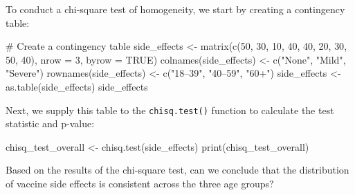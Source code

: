 \documentclass[
  letterpaper,
  DIV=11,
  numbers=noendperiod]{scrartcl}
\newenvironment{Shaded}{\begin{snugshade}}{\end{snugshade}}
\newcommand{\AttributeTok}[1]{\textcolor[rgb]{0.40,0.45,0.13}{#1}}
\newcommand{\CommentTok}[1]{\textcolor[rgb]{0.37,0.37,0.37}{#1}}
\newcommand{\ConstantTok}[1]{\textcolor[rgb]{0.56,0.35,0.01}{#1}}
\newcommand{\DecValTok}[1]{\textcolor[rgb]{0.68,0.00,0.00}{#1}}
\newcommand{\FunctionTok}[1]{\textcolor[rgb]{0.28,0.35,0.67}{#1}}
\newcommand{\NormalTok}[1]{\textcolor[rgb]{0.00,0.23,0.31}{#1}}
\newcommand{\OtherTok}[1]{\textcolor[rgb]{0.00,0.23,0.31}{#1}}
\newcommand{\StringTok}[1]{\textcolor[rgb]{0.13,0.47,0.30}{#1}}
\begin{document}
To conduct a chi-square test of homogeneity, we start by creating a
contingency table:

\begin{Shaded}
\begin{Highlighting}[]
\CommentTok{\# Create a contingency table}
\NormalTok{side\_effects }\OtherTok{\textless{}{-}} \FunctionTok{matrix}\NormalTok{(}\FunctionTok{c}\NormalTok{(}\DecValTok{50}\NormalTok{, }\DecValTok{30}\NormalTok{, }\DecValTok{10}\NormalTok{, }\DecValTok{40}\NormalTok{, }\DecValTok{40}\NormalTok{, }\DecValTok{20}\NormalTok{, }\DecValTok{30}\NormalTok{, }\DecValTok{50}\NormalTok{, }\DecValTok{40}\NormalTok{), }\AttributeTok{nrow =} \DecValTok{3}\NormalTok{, }\AttributeTok{byrow =} \ConstantTok{TRUE}\NormalTok{)}
\FunctionTok{colnames}\NormalTok{(side\_effects) }\OtherTok{\textless{}{-}} \FunctionTok{c}\NormalTok{(}\StringTok{"None"}\NormalTok{, }\StringTok{"Mild"}\NormalTok{, }\StringTok{"Severe"}\NormalTok{)}
\FunctionTok{rownames}\NormalTok{(side\_effects) }\OtherTok{\textless{}{-}} \FunctionTok{c}\NormalTok{(}\StringTok{"18–39"}\NormalTok{, }\StringTok{"40–59"}\NormalTok{, }\StringTok{"60+"}\NormalTok{)}
\NormalTok{side\_effects }\OtherTok{\textless{}{-}} \FunctionTok{as.table}\NormalTok{(side\_effects)}
\NormalTok{side\_effects}
\end{Highlighting}
\end{Shaded}

Next, we supply this table to the \texttt{chisq.test()} function to
calculate the test statistic and p-value:

\begin{Shaded}
\begin{Highlighting}[]
\NormalTok{chisq\_test\_overall }\OtherTok{\textless{}{-}} \FunctionTok{chisq.test}\NormalTok{(side\_effects)}
\FunctionTok{print}\NormalTok{(chisq\_test\_overall)}
\end{Highlighting}
\end{Shaded}

\begin{tcolorbox}[enhanced jigsaw, bottomrule=.15mm, coltitle=black, colbacktitle=quarto-callout-important-color!10!white, left=2mm, bottomtitle=1mm, breakable, colframe=quarto-callout-important-color-frame, toprule=.15mm, titlerule=0mm, title={Question 7}, opacitybacktitle=0.6, arc=.35mm, rightrule=.15mm, opacityback=0, leftrule=.75mm, toptitle=1mm, colback=white]

Based on the results of the chi-square test, can we conclude that the
distribution of vaccine side effects is consistent across the three age
groups?

\end{tcolorbox}
\end{document}

